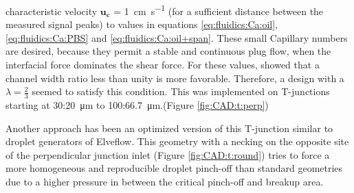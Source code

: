 characteristic velocity $\mathbf{u_c}$ = \SI{1}{\centi\meter\per\second} (for a sufficient distance between the measured signal peaks) to values in equations \ref{eq:fluidics:Ca:oil}, \ref{eq:fluidics:Ca:PBS} and \ref{eq:fluidics:Ca:oil+span}. 
These small Capillary numbers are desired, because they permit a stable and continuous plug flow, when the interfacial force dominates the shear force. For these values, \citet{lit:fluidics:droplet:formation:t-junction:numerical} showed that a channel width ratio less than unity is more favorable. Therefore, a design with a $\lambda = \frac{2}{3}$ seemed to satisfy this condition. This was implemented on T-junctions starting at 30:\SI{20}{\micro\meter} to 100:\SI{66.7}{\micro\meter}.(Figure \ref{fig:CAD:t:perp})


Another approach has been an optimized version of this T-junction similar to droplet generators of Elveflow.\cite{lit:nano:eveflow} This geometry with a necking on the opposite site of the perpendicular junction inlet (Figure \ref{fig:CAD:t:round}) tries to force a more homogeneous and reproducible droplet pinch-off than standard geometries due to a higher pressure in between the critical pinch-off and breakup area.


